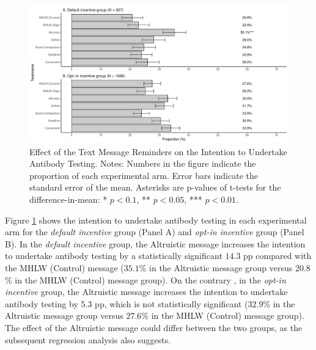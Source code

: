 \documentclass[
]{article}
\begin{document}
\begin{figure}[t]
\includegraphics{discussion-paper_files/figure-latex/ttest-int-test-1} \caption{Effect of the Text Message Reminders on the Intention to Undertake Antibody Testing. Notes: Numbers in the figure indicate the proportion of each experimental arm. Error bars indicate the standard error of the mean. Asterisks are p-values of t-tests for the difference-in-mean: * $p < 0.1$, ** $p < 0.05$, *** $p < 0.01$.}\label{fig:ttest-int-test}
\end{figure}

Figure \ref{fig:ttest-int-test} shows the intention to undertake antibody testing in each experimental arm for the \emph{default incentive} group (Panel A) and \emph{opt-in incentive} group (Panel B). In the \emph{default incentive} group, the Altruistic message increases the intention to undertake antibody testing by a statistically significant \(14.3\) pp compared with the MHLW (Control) message (\(35.1\)\% in the Altruistic message group versus \(20.8\)\% in the MHLW (Control) message group). On the contrary , in the \emph{opt-in incentive} group, the Altruistic message increases the intention to undertake antibody testing by \(5.3\) pp, which is not statistically significant (\(32.9\)\% in the Altruistic message group versus \(27.6\)\% in the MHLW (Control) message group). The effect of the Altruistic message could differ between the two groups, as the subsequent regression analysis also suggests.
\end{document}
